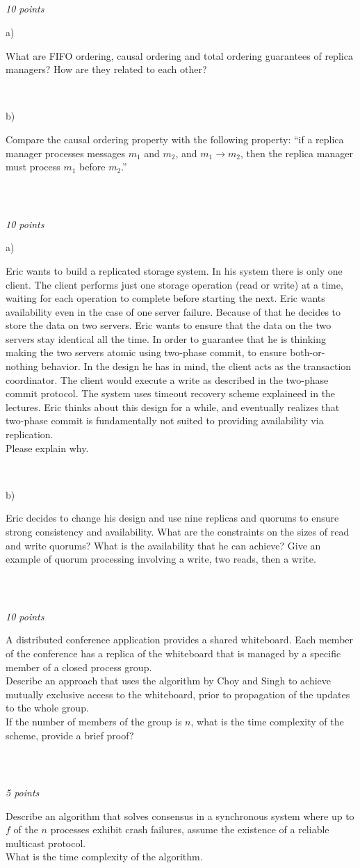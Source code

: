 \documentclass[a4paper]{article}
\newcommand{\points}[1]{\subsection{} \textit{#1 points}\\}
\newcommand{\question}[2][]{
  \noindent
  \parbox[t]{\textwidth}{#1 \parbox[t]{0.95\textwidth}{#2}}\\
}
\begin{document}
\points{10}
\question[a)]{What are FIFO ordering, causal ordering and total
  ordering guarantees of replica managers? How are they related to
  each other?}
\question[b)]{Compare the causal ordering property with the following
property: ``if a replica manager processes messages $m_1$ and $m_2$,
and $m_1 \rightarrow m_2$, then the replica manager must process $m_1$
before $m_2$.''}

\points{10}
\question[a)]{Eric wants to build a replicated storage system. In his
  system there is only one client. The client performs just one
  storage operation (read or write) at a time, waiting for each
  operation to complete before starting the next. Eric wants
  availability even in the case of one server failure. Because of that
  he decides to store the data on two servers. Eric wants to ensure
  that the data on the two servers stay identical all the time. In
  order to guarantee that he is thinking making the two servers atomic
  using two-phase commit, to ensure both-or-nothing behavior. In the
  design he has in mind, the client acts as the transaction
  coordinator. The client would execute a write as described in the
  two-phase commit protocol. The system uses timeout recovery scheme
  explaineed in the lectures. Eric thinks about this design for a
  while, and eventually realizes that two-phase commit is
  fundamentally not suited to providing availability via
  replication. \\
  Please explain why.}
\question[b)]{Eric decides to change his design and use nine replicas
  and quorums to ensure strong consistency and availability. What are
  the constraints on the sizes of read and write quorums? What is the
  availability that he can achieve? Give an example of quorum
  processing involving a write, two reads, then a write.}


\points{10}
\question{A distributed conference application provides a shared
  whiteboard. Each member of the conference has a replica of the
  whiteboard that is managed by a specific member of a closed process
  group. \\
  Describe an approach that uses the algorithm by Choy and Singh to
  achieve mutually exclusive access to the whiteboard, prior to
  propagation of the updates to the whole group. \\
  If the number of members of the group is $n$, what is the time
  complexity of the scheme, provide a brief proof?}

\points{5}
\question{Describe an algorithm that solves consensus in a synchronous
  system where up to $f$ of the $n$ processes exhibit crash failures,
  assume the existence of a reliable multicast protocol. \\
  What is the time complexity of the algorithm.}
\end{document}
